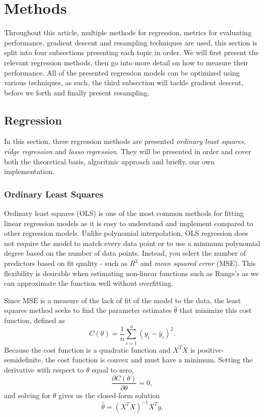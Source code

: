 \documentclass[amssymb,twocolumn,aps]{revtex4}
\begin{document}
\section{Methods}\label{section:methods}
Throughout this article, multiple methods for regression, metrics for evaluating performance, gradient descent and resampling techniques are used, this section is split into four subsections presenting each topic in order. We will first present the relevant regression methods, then go into more detail on how to measure their performance. All of the presented regression models can be optimized using various techniques, as such, the third subsection will tackle gradient descent, before we forth and finally present resampling.

\subsection{Regression}
In this section, three regression methods are presented \textit{ordinary least squares, ridge regression} and \textit{lasso regression}. They will be presented in order and cover both the theoretical basis, algoritmic approach and briefly, our own implementation.

\subsubsection{Ordinary Least Squares}
Ordinary least squares (OLS) is one of the most common methods for fitting linear regression models as it is easy to understand and implement compared to other regression models. Unlike polynomial interpolation, OLS regression does not require the model to match every data point or to use a minimum polynomial degree based on the number of data points. Instead, you select the number of predictors based on fit quality - such as $R^2$ and \textit{mean squared error} (MSE). This flexibility is desirable when estimating non-linear functions such as Runge's as we can approximate the function well without overfitting.


Since MSE is a measure of the lack of fit of the model to the data, the least squares method seeks to find the parameter estimates $\hat{\theta}$ that minimize this cost function, defined as
$$C(\theta)  = \frac{1}{n} \sum_{i=1}^{n} \left( y_i - \hat{y}_i \right)^2.$$
Because the cost function is a quadratic function and $X^TX$ is positive-semidefinite, the cost function is convex and must have a minimum. Setting the derivative with respect to $\theta$ equal to zero, $$\frac{\partial C(\theta)}{\partial \theta} = 0,$$
and solving for $\theta$ gives us the closed-form solution
$$\hat{\theta} = \left( X^T X \right)^{-1} X^T y.$$
\end{document}
